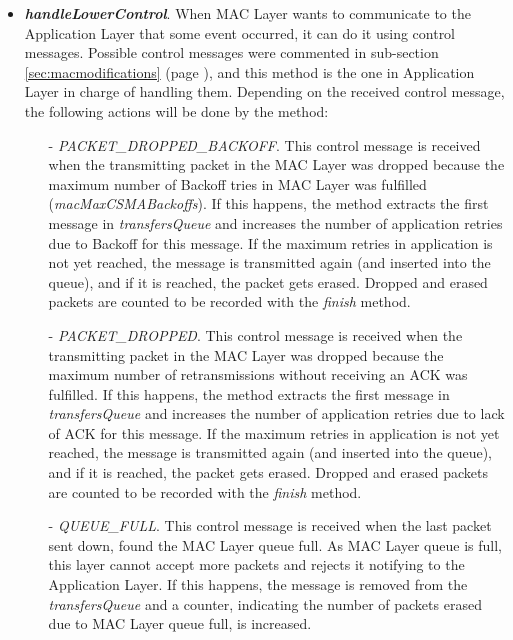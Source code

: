 \begin{itemize}
 \item \textbf{\textit{handleLowerControl}}. When \ac{MAC} Layer wants to communicate to the Application Layer that some event occurred, it can do 
it using control messages. Possible control messages were commented in sub-section \ref{sec:macmodifications} (page \pageref{sec:macmodifications}),
and this method is the one in Application Layer in charge of handling them. Depending on the received control message, the following actions will
be done by the method:
  \begin{itemize}
    \item[-] \textit{PACKET\_DROPPED\_BACKOFF}. This control message is received when the transmitting packet in the \ac{MAC} Layer was dropped because
    the maximum number of Backoff tries in \ac{MAC} Layer was fulfilled (\textit{macMaxCSMABackoffs}). If this happens, the method extracts the first 
    message in \textit{transfersQueue} and increases the number of application retries due to Backoff for this message. If the maximum retries in 
    application is not yet reached, the message is transmitted again (and inserted into the queue), and if it is reached, the packet gets erased. 
    Dropped and erased packets are counted to be recorded with the \textit{finish} method.

    \item[-] \textit{PACKET\_DROPPED}. This control message is received when the transmitting packet in the \ac{MAC} Layer was dropped because
    the maximum number of retransmissions without receiving an \ac{ACK} was fulfilled. If this happens, the method extracts the first message in
    \textit{transfersQueue} and increases the number of application retries due to lack of \ac{ACK} for this message. If the maximum retries in
    application is not yet reached, the message is transmitted again (and inserted into the queue), and if it is reached, the packet gets erased.
    Dropped and erased packets are counted to be recorded with the \textit{finish} method.

    \item[-] \textit{QUEUE\_FULL}. This control message is received when the last packet sent down, found the \ac{MAC} Layer queue full. As 
    \ac{MAC} Layer queue is full, this layer cannot accept more packets and rejects it notifying to the Application Layer. If this happens, the message
    is removed from the \textit{transfersQueue} and a counter, indicating the number of packets erased due to \ac{MAC} Layer queue full, is increased.


\end{itemize}
\end{itemize}
